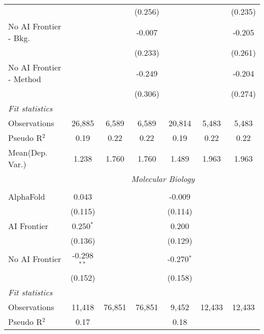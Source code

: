 \begin{tabular}{lcccccc}
                           &               &         & (0.256) &               &         & (0.235)\\   
   No AI Frontier - Bkg.   &               &         & -0.007  &               &         & -0.205\\   
                           &               &         & (0.233) &               &         & (0.261)\\   
   No AI Frontier - Method &               &         & -0.249  &               &         & -0.204\\   
                           &               &         & (0.306) &               &         & (0.274)\\   
   \midrule
   \emph{Fit statistics}\\
   Observations            & 26,885        & 6,589   & 6,589   & 20,814        & 5,483   & 5,483\\  
   Pseudo R$^2$            & 0.19          & 0.22    & 0.22    & 0.19          & 0.22    & 0.22\\  
Mean(Dep. Var.) & 1.238 & 1.760 & 1.760 & 1.489 & 1.963 & 1.963 \\
   
 & \multicolumn{6}{c}{\textit{Molecular Biology}} \\ \\
   AlphaFold      & 0.043         &        &        & -0.009       &        &   \\   
                  & (0.115)       &        &        & (0.114)      &        &   \\   
   AI Frontier    & 0.250$^{*}$   &        &        & 0.200        &        &   \\   
                  & (0.136)       &        &        & (0.129)      &        &   \\   
   No AI Frontier & -0.298$^{**}$ &        &        & -0.270$^{*}$ &        &   \\   
                  & (0.152)       &        &        & (0.158)      &        &   \\   
   \midrule
   \emph{Fit statistics}\\
   Observations   & 11,418        & 76,851 & 76,851 & 9,452        & 12,433 & 12,433\\  
   Pseudo R$^2$   & 0.17          &        &        & 0.18         &        & \\  
   

\end{tabular}

